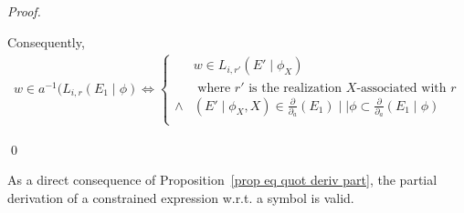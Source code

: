 \documentclass[a4paper]{llncs}
\begin{document}
\begin{proof}
\begin{enumerate}
      Consequently, 
        \begin{align*}
        w\in a^{-1}(L_{i,r}(E_1\mid \phi)
        \Leftrightarrow
        \begin{cases}
          & w\in L_{i,r'}(E' \mid \phi_X)\\
          & \text{ where $r'$ is the realization $X$-associated with $r$}\\
          \wedge & (E'\mid \phi_X,X)\in \frac{\partial}{\partial_a}(E_1) \mid\mid \phi \subset \frac{\partial}{\partial_a}(E_1\mid\phi)\\
        \end{cases}
        \end{align*}       
    \end{enumerate}    
    \qed
  \end{proof}
  
  As a direct consequence of Proposition~\ref{prop eq quot deriv part}, the partial derivation of a constrained expression w.r.t. a symbol is valid.
  
\end{document}
